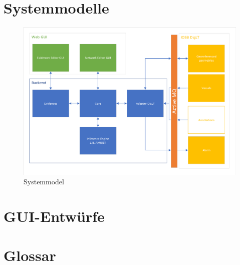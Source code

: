 \documentclass[parskip=full,11pt,twoside]{scrartcl}
\begin{document}
\section{Systemmodelle}
\begin{figure}[h!]
  \includegraphics[width=\linewidth]{image/PSE20191028.pdf}
  \caption{Systemmodel}
  \label{fig: Systemmodel}
\end{figure}

\appendix

\section{GUI-Entwürfe}
\label{section:gui}


\section{Glossar}
\end{document}

